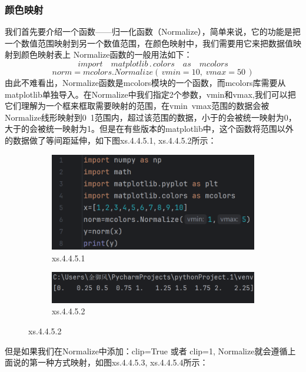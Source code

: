 \documentclass[12pt]{article}
\begin{document}
\subsubsection{颜色映射}
我们首先要介绍一个函数——归一化函数（Normalize），简单来说，它的功能是把一个数值范围映射到另一个数值范围，在颜色映射中，我们需要用它来把数据值映射到颜色映射表上
Normalize函数的一般用法如下：
\[import\quad matplotlib\,.\,colors\quad as\quad mcolors\]
\[norm = mcolors.Normalize(\,vmin=10,\; vmax=50\,)\]
由此不难看出，Normalize函数是mcolors模块的一个函数，而mcolors库需要从matplotlib单独导入。在Normalize中我们指定2个参数，vmin和vmax,我们可以把它们理解为一个框来框取需要映射的范围，在vmin~vmax范围的数据会被Normalize线形映射到0~1范围内，超过该范围的数据，小于的会被统一映射为0，大于的会被统一映射为1。但是在有些版本的matplotlib中，这个函数将范围以外的数据做了等间距延伸，如下图xs.4.4.5.1, xs.4.4.5.2所示：
\begin{figure}[H]
    \centering
    \begin{subfigure}[b]{0.6\textwidth}
        \includegraphics[width=\textwidth]{normalize program1.png} %
        \caption{xs.4.4.5.1}
        \label{fig:line-graph2}
    \end{subfigure}
    \hfill
    \begin{subfigure}[b]{0.6\textwidth}
        \includegraphics[width=\textwidth]{normalize output1.png} %
        \caption{xs.4.4.5.2}
        \label{fig:line-graph2-pic2}
    \end{subfigure}
\end{figure}
但是如果我们在Normalize中添加：clip=True 或者 clip=1, Normalize就会遵循上面说的第一种方式映射，如图xs.4.4.5.3, xs.4.4.5.4所示：
\end{document}
